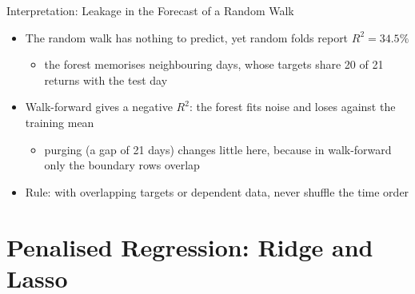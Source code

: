 \begin{frame}{Interpretation: Leakage in the Forecast of a Random Walk}
\itemsize{\small}
\begin{itemize}
    \item The random walk has nothing to predict, yet random folds report $R^2 = 34.5\%$
    \begin{itemize}
        \item the forest memorises neighbouring days, whose targets share 20 of 21 returns with the test day
    \end{itemize}
    \item Walk-forward gives a negative $R^2$: the forest fits noise and loses against the training mean
    \begin{itemize}
        \item purging (a gap of 21 days) changes little here, because in walk-forward only the boundary rows overlap
    \end{itemize}
    \item Rule: with overlapping targets or dependent data, never shuffle the time order
\end{itemize}
\end{frame}


\section{Penalised Regression: Ridge and Lasso}

